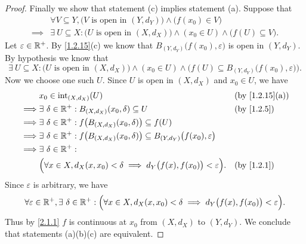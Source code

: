 \begin{proof}
  Finally we show that statement (c) implies statement (a).
  Suppose that
  \begin{align*}
             & \forall V \subseteq Y, \big(V \text{ is open in } (Y, d_Y)\big) \land \big(f(x_0) \in V\big)                          \\
    \implies & \exists\ U \subseteq X : \big(U \text{ is open in } (X, d_X)\big) \land (x_0 \in U) \land \big(f(U) \subseteq V\big).
  \end{align*}
  Let \(\varepsilon \in \mathbb{R}^+\).
  By \cref{1.2.15}(c) we know that \(B_{(Y, d_Y)}\big(f(x_0), \varepsilon\big)\) is open in \((Y, d_Y)\).
  By hypothesis we know that
  \[
    \exists\ U \subseteq X : \big(U \text{ is open in } (X, d_X)\big) \land (x_0 \in U) \land \Big(f(U) \subseteq B_{(Y, d_Y)}\big(f(x_0), \varepsilon\big)\Big).
  \]
  Now we choose one such \(U\).
  Since \(U\) is open in \((X, d_X)\) and \(x_0 \in U\), we have
  \begin{align*}
             & x_0 \in \text{int}_{(X, d_X)}(U)                                                                                    &  & \text{(by \cref{1.2.15}(a))} \\
    \implies & \exists\ \delta \in \R^+ : B_{(X, d_X)}(x_0, \delta) \subseteq U                                                    &  & \by{1.2.5}                   \\
    \implies & \exists\ \delta \in \R^+ : f\big(B_{(X, d_X)}(x_0, \delta)\big) \subseteq f(U)                                                                        \\
    \implies & \exists\ \delta \in \R^+ : f\big(B_{(X, d_X)}(x_0, \delta)\big) \subseteq B_{(Y, d_Y)}\big(f(x_0), \varepsilon\big)                                   \\
    \implies & \exists\ \delta \in \R^+ :                                                                                                                            \\
             & \Big(\forall x \in X, d_X(x, x_0) < \delta \implies d_Y\big(f(x), f(x_0)\big) < \varepsilon\Big).                   &  & \by{1.2.1}
  \end{align*}
  Since \(\varepsilon\) is arbitrary, we have
  \[
    \forall \varepsilon \in \mathbb{R}^+, \exists\ \delta \in \mathbb{R}^+ : \Big(\forall x \in X, d_X(x, x_0) < \delta \implies d_Y\big(f(x), f(x_0)\big) < \varepsilon\Big).
  \]
  Thus by \cref{2.1.1} \(f\) is continuous at \(x_0\) from \((X, d_X)\) to \((Y, d_Y)\).
  We conclude that statements (a)(b)(c) are equivalent.
\end{proof}

